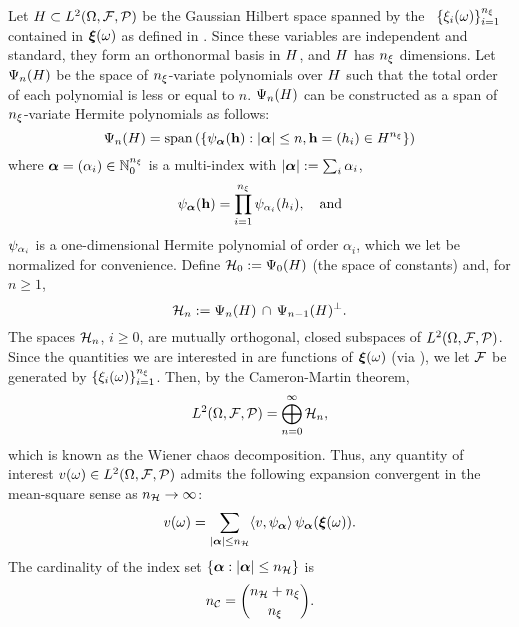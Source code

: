 Let $H \subset L^{2}(\Omega, \mathcal{F}, \mathcal{P})$ be the Gaussian Hilbert space \cite{janson1997} spanned by the \rvs\ $\{ \xi_i(\omega) \}_{i = 1}^{n_\xi}$ contained in ${\boldsymbol\xi}(\omega)$ as defined in .
Since these variables are independent and standard, they form an orthonormal basis in $H$, and $H$ has ${n_\xi}$ dimensions.
Let $\Psi_n(H)$ be the space of ${n_\xi}$-variate polynomials over $H$ such that the total order of each polynomial is less or equal to $n$.
$\Psi_n(H)$ can be constructed as a span of ${n_\xi}$-variate Hermite polynomials \cite{maitre2010, eldred2008} as follows:
\[
  \Psi_{n}(H) = \text{span}\left( \left\{ \psi_{\boldsymbol \alpha}(\mathbf{h}): |\boldsymbol \alpha| \leq n, \mathbf{h} = (h_i) \in H^{n_\xi} \right\} \right)
\]
where $\boldsymbol \alpha = (\alpha_i) \in \mathbb{N}_0^{n_\xi}$ is a multi-index with $|\boldsymbol \alpha| := \sum_i \alpha_i$,
\[
  \psi_{\boldsymbol \alpha}(\mathbf{h}) = \prod_{i = 1}^{n_\xi} \psi_{\alpha_i}(h_i), \hspace{1em} \text{and}
\]
$\psi_{\alpha_i}$ is a one-dimensional Hermite polynomial of order $\alpha_i$, which we let be normalized for convenience.
Define $\mathcal{H}_0 := \Psi_0(H)$ (the space of constants) and, for $n \geq 1$,
\[
  \mathcal{H}_n := \Psi_n(H) \, \cap \, \Psi_{n - 1}(H)^\perp.
\]
The spaces $\mathcal{H}_n$, $i \geq 0$, are mutually orthogonal, closed subspaces of $L^{2}(\Omega, \mathcal{F}, \mathcal{P})$.
Since the quantities we are interested in are functions of ${\boldsymbol\xi}(\omega)$ (via ), we let $\mathcal{F}$ be generated by $\{ \xi_i(\omega) \}_{i = 1}^{n_\xi}$.
Then, by the Cameron-Martin theorem,
\[
  L^{2}(\Omega, \mathcal{F}, \mathcal{P}) = \bigoplus_{n = 0}^\infty \mathcal{H}_n,
\]
which is known as the Wiener chaos decomposition.
Thus, any quantity of interest $v(\omega) \in L^{2}(\Omega, \mathcal{F}, \mathcal{P})$ admits the following expansion convergent in the mean-square sense as ${n_\mathcal{H}} \to \infty$:
\begin{equation} \xelab{wiener-chaos-decomposition}
  \w(\o) = \sum_{|\multiindex| \leq \ncorder} \innerProduct{\w, \polynomial_{\multiindex}} \, \polynomial_{\multiindex}(\vz(\o)).
\end{equation}
The cardinality of the index set $\{ \boldsymbol \alpha: |\boldsymbol \alpha| \leq {n_\mathcal{H}} \}$ is
\[
  {n_\mathcal{C}} = { {n_\mathcal{H}} + {n_\xi} \choose {n_\xi} }.
\]
